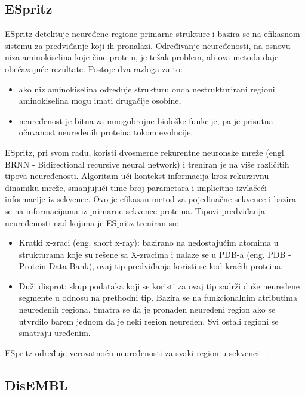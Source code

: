 \subsection{ESpritz}
ESpritz detektuje neuređene regione primarne strukture i bazira se na efikasnom sistemu za predviđanje koji ih pronalazi. Određivanje neuređenosti, na osnovu niza aminokiselina koje čine protein, je težak problem, ali ova metoda daje obećavajuće rezultate. Postoje dva razloga za to:
\begin{itemize}
\item  ako niz aminokiselina određuje strukturu onda nestrukturirani regioni aminokiselina mogu imati drugačije osobine, 
\item neuređenost je bitna za mnogobrojne biološke funkcije, pa je prisutna očuvanost neuređenih proteina tokom evolucije. 
\end{itemize}

ESpritz, pri svom radu, koristi dvosmerne rekurentne neuronske mreže (engl. BRNN - Bidirectional recursive neural network) i treniran je na više različitih tipova neuređenosti. Algoritam uči kontekst informacija kroz rekurzivnu dinamiku mreže, smanjujući time broj parametara i implicitno izvlačeći informacije iz sekvence. Ovo je efikasan metod za pojedinačne sekvence i bazira se na informacijama iz primarne sekvence proteina. Tipovi predviđanja neuređenosti nad kojima je ESpritz treniran su:
\begin{itemize}
\item Kratki x-zraci (eng. short x-ray): bazirano na nedostajućim atomima u strukturama koje su rešene sa X-zracima i nalaze se u PDB-a (eng. PDB - Protein Data Bank), ovaj tip predviđanja koristi se kod kraćih proteina. 
\item Duži disprot: skup podataka koji se koristi za ovaj tip sadrži duže neuređene segmente u odnosu na prethodni tip. Bazira se na funkcionalnim atributima neuređenih regiona. Smatra se da je pronađen neuređeni region ako se utvrdilo barem jednom da je neki region neuređen. Svi ostali regioni se smatraju uređenim.
\end{itemize}
ESpritz određuje verovatnoću neuređenosti za svaki region u sekvenci ~\cite{ESpritzAFPD, ESpritzEP, ESpritz2, ESpritz3}.

\subsection{DisEMBL}

